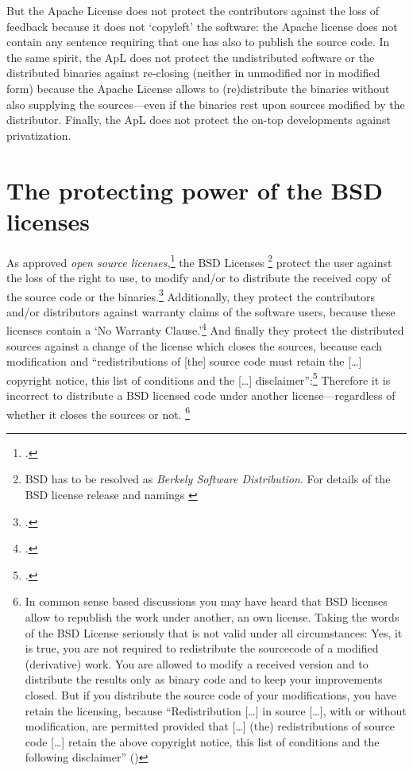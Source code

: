 But the Apache License does not protect the contributors against the loss of
feedback because it does not `copyleft' the software: the Apache license does
not contain any sentence requiring that one has also to publish the source code.
In the same spirit, the ApL does not protect the undistributed software or the
distributed binaries against re-closing (neither in unmodified nor in
modified form) because the Apache License allows to (re)distribute the
binaries without also supplying the sources---even if the binaries rest upon
sources modified by the distributor. Finally, the ApL does not protect the
on-top developments against privatization.


\section{\texorpdfstring{The protecting power of the}{The} BSD licenses}

As approved \emph{open source licenses,}\footcite[cf.][\nopage wp]{OSI2012b} the
BSD Licenses%
  \footnote{BSD has to be resolved as \emph{Berkely Software Distribution}. 
  For details of the BSD license release and namings
  \cite[cf.][\nopage wp.\ editorial]{BsdLicense3Clause}} 
protect the user against
the loss of the right to use, to modify and/or to distribute the received copy
of the source code or the binaries.\footcite[cf.][\nopage wp. §1ff]{OSI2012a}
Additionally, they protect the contributors and/or distributors against warranty
claims of the software users, because these licenses contain a `No Warranty
Clause.'\footcite[one for all version cf.][\nopage wp]{BsdLicense2Clause} And
finally they protect the distributed sources against a change of the license
which closes the sources, because each modification and \enquote{redistributions
of [the] source code must retain the [\ldots] copyright notice, this list of
conditions and the [\ldots] disclaimer}:\footcite[cf.][\nopage
wp]{BsdLicense2Clause} Therefore it is incorrect to distribute a BSD licensed
code under another license---regardless of whether it closes the sources or
not.%
  \footnote{In common sense based discussions you may have heard that BSD
  licenses allow to republish the work under another, an own license. Taking the
  words of the BSD License seriously that is not valid under all circumstances:
  Yes, it is true, you are not required to redistribute the sourcecode of a
  modified (derivative) work. You are allowed to modify a received version and to
  distribute the results only as binary code and to keep your improvements closed.
  But if you distribute the source code of your modifications, you have retain the
  licensing, because \enquote{Redistribution [\ldots] in source [\ldots], with or
  without modification, are permitted provided that [\ldots] (the) redistributions
  of source code [\ldots] retain the above copyright notice, this list of
  conditions and the following disclaimer} (\cite[cf.][\nopage
  wp]{BsdLicense2Clause})}

